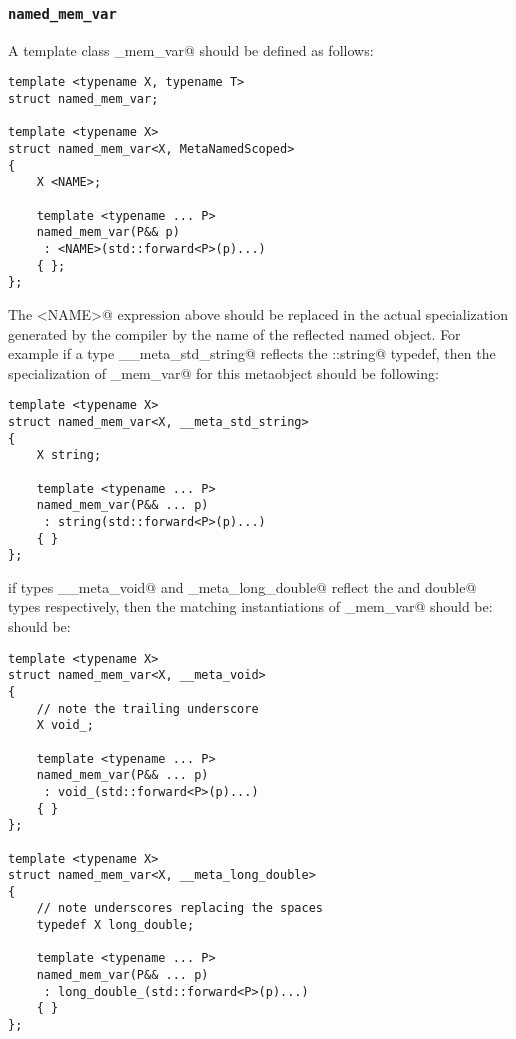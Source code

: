 \subsubsection{\texttt{named\_mem\_var}}

A template class \verb@named_mem_var@ should be defined as follows:

\begin{lstlisting}
template <typename X, typename T>
struct named_mem_var;

template <typename X>
struct named_mem_var<X, MetaNamedScoped>
{
	X <NAME>;

	template <typename ... P>
	named_mem_var(P&& p)
	 : <NAME>(std::forward<P>(p)...)
	{ };
};
\end{lstlisting}

The \verb@<NAME>@ expression above should be replaced in the actual specialization generated by the compiler
by the name of the reflected named object. For example if a type \verb@__meta_std_string@
reflects the \verb@std::string@ typedef, then the specialization of \verb@named_mem_var@
for this metaobject should be following:

\begin{lstlisting}
template <typename X>
struct named_mem_var<X, __meta_std_string>
{
	X string;

	template <typename ... P>
	named_mem_var(P&& ... p)
	 : string(std::forward<P>(p)...)
	{ }
};
\end{lstlisting}

if types \verb@__meta_void@ and \verb@_meta_long_double@ reflect the \verb@void@ and \verb@long double@
types respectively, then the matching instantiations of \verb@named_mem_var@ should be:
should be:

\begin{lstlisting}
template <typename X>
struct named_mem_var<X, __meta_void>
{
	// note the trailing underscore
	X void_;

	template <typename ... P>
	named_mem_var(P&& ... p)
	 : void_(std::forward<P>(p)...)
	{ }
};

template <typename X>
struct named_mem_var<X, __meta_long_double>
{
	// note underscores replacing the spaces
	typedef X long_double;

	template <typename ... P>
	named_mem_var(P&& ... p)
	 : long_double_(std::forward<P>(p)...)
	{ }
};
\end{lstlisting}

